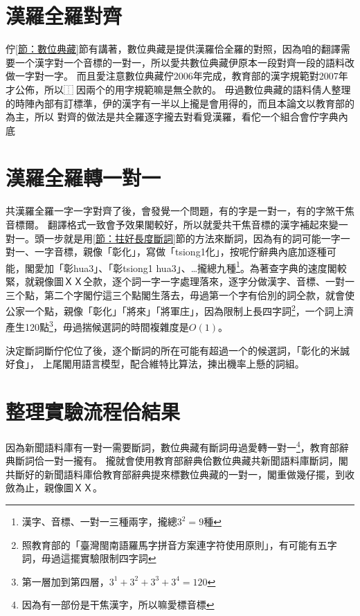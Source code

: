 \documentclass[final,oneside,onecolumn,12pt,a4paper]{book}%
\begin{document}
\section{漢羅全羅對齊}
\label{節：漢羅全羅對齊}
佇\ref{節：數位典藏}節有講著，數位典藏是提供漢羅佮全羅的對照，因為咱的翻譯需要一个漢字對一个音標的一對一，所以愛共數位典藏伊原本一段對齊一段的語料改做一字對一字。
而且愛注意數位典藏佇2006年完成，教育部的漢字規範對2007年才公佈，所以⿰因兩个的用字規範嘛是無仝款的。
毋過數位典藏的語料倩人整理的時陣內部有訂標準，伊的漢字有一半以上攏是會用得的，而且本論文以教育部的為主，所以
對齊的做法是共全羅逐字攏去對看覓漢羅，看佗一个組合會佇字典內底




\section{漢羅全羅轉一對一}
\label{節：漢羅全羅轉一對一}
共漢羅全羅一字一字對齊了後，會發覺一个問題，有的字是一對一，有的字煞干焦音標爾。
翻譯格式一致會予效果閣較好，所以就愛共干焦音標的漢字補起來變一對一。頭一步就是用\ref{節：拄好長度斷詞}節的方法來斷詞，因為有的詞可能一字一對一、一字音標，親像「彰化」，寫做「tsiong1化」，按呢佇辭典內底加逐種可能，閣愛加「彰hua3」、「彰tsiong1 hua3」、…攏總九種\footnote{漢字、音標、一對一三種兩字，攏總$3^{2}=9$種}。為著查字典的速度閣較緊，就親像圖ＸＸ仝款，逐个詞一字一字處理落來，逐字分做漢字、音標、一對一三个點，第二个字閣佇這三个點閣生落去，毋過第一个字有佮別的詞仝款，就會使公家一个點，親像「彰化」「將來」「將軍庄」，因為限制上長四字詞\footnote{照教育部的「臺灣閩南語羅馬字拼音方案連字符使用原則」，有可能有五字詞，毋過這擺實驗限制四字詞}，一个詞上濟產生120點\footnote{第一層加到第四層，$3^{1}+3^{2}+3^{3}+3^{4}=120$}，毋過揣候選詞的時間複雜度是$O(1)$。

決定斷詞斷佇佗位了後，逐个斷詞的所在可能有超過一个的候選詞，「彰化的米誠好食」，
上尾閣用語言模型，配合維特比算法，揀出機率上懸的詞組。

\section{整理實驗流程佮結果}
\label{節：整理實驗流程佮結果}

因為新聞語料庫有一對一需要斷詞，數位典藏有斷詞毋過愛轉一對一\footnote{因為有一部份是干焦漢字，所以嘛愛標音標}，教育部辭典斷詞佮一對一攏有。
攏就會使用教育部辭典佮數位典藏共新聞語料庫斷詞，閣共斷好的新聞語料庫佮教育部辭典提來標數位典藏的一對一，閣重做幾仔擺，到收斂為止，親像圖ＸＸ。
\end{document}
